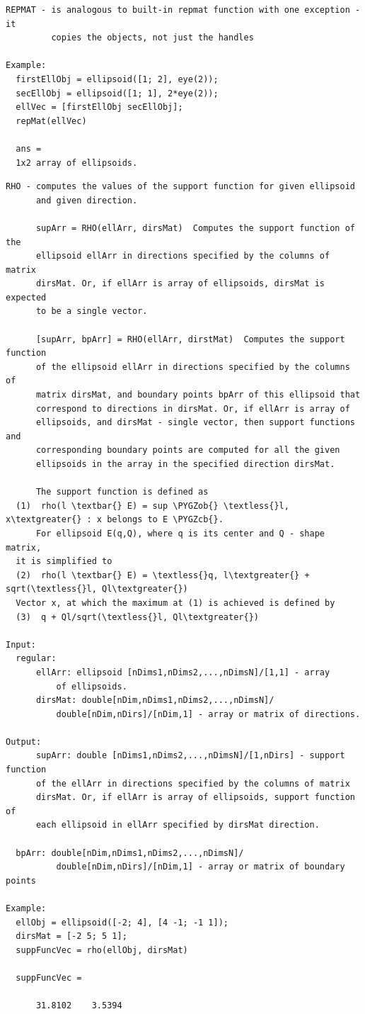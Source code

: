 \documentclass[letterpaper,10pt,english]{sphinxmanual}
\def\PYGZob{\char`\{}
\def\PYGZcb{\char`\}}
\begin{document}
\begin{Verbatim}[commandchars=\\\{\}]
REPMAT - is analogous to built-in repmat function with one exception - it
         copies the objects, not just the handles

Example:
  firstEllObj = ellipsoid([1; 2], eye(2));
  secEllObj = ellipsoid([1; 1], 2*eye(2));
  ellVec = [firstEllObj secEllObj];
  repMat(ellVec)

  ans =
  1x2 array of ellipsoids.
\end{Verbatim}

\begin{Verbatim}[commandchars=\\\{\}]
RHO - computes the values of the support function for given ellipsoid
      and given direction.

      supArr = RHO(ellArr, dirsMat)  Computes the support function of the
      ellipsoid ellArr in directions specified by the columns of matrix
      dirsMat. Or, if ellArr is array of ellipsoids, dirsMat is expected
      to be a single vector.

      [supArr, bpArr] = RHO(ellArr, dirstMat)  Computes the support function
      of the ellipsoid ellArr in directions specified by the columns of
      matrix dirsMat, and boundary points bpArr of this ellipsoid that
      correspond to directions in dirsMat. Or, if ellArr is array of
      ellipsoids, and dirsMat - single vector, then support functions and
      corresponding boundary points are computed for all the given
      ellipsoids in the array in the specified direction dirsMat.

      The support function is defined as
  (1)  rho(l \textbar{} E) = sup \PYGZob{} \textless{}l, x\textgreater{} : x belongs to E \PYGZcb{}.
      For ellipsoid E(q,Q), where q is its center and Q - shape matrix,
  it is simplified to
  (2)  rho(l \textbar{} E) = \textless{}q, l\textgreater{} + sqrt(\textless{}l, Ql\textgreater{})
  Vector x, at which the maximum at (1) is achieved is defined by
  (3)  q + Ql/sqrt(\textless{}l, Ql\textgreater{})

Input:
  regular:
      ellArr: ellipsoid [nDims1,nDims2,...,nDimsN]/[1,1] - array
          of ellipsoids.
      dirsMat: double[nDim,nDims1,nDims2,...,nDimsN]/
          double[nDim,nDirs]/[nDim,1] - array or matrix of directions.

Output:
      supArr: double [nDims1,nDims2,...,nDimsN]/[1,nDirs] - support function
      of the ellArr in directions specified by the columns of matrix
      dirsMat. Or, if ellArr is array of ellipsoids, support function of
      each ellipsoid in ellArr specified by dirsMat direction.

  bpArr: double[nDim,nDims1,nDims2,...,nDimsN]/
          double[nDim,nDirs]/[nDim,1] - array or matrix of boundary points

Example:
  ellObj = ellipsoid([-2; 4], [4 -1; -1 1]);
  dirsMat = [-2 5; 5 1];
  suppFuncVec = rho(ellObj, dirsMat)

  suppFuncVec =

      31.8102    3.5394
\end{Verbatim}
\end{document}
